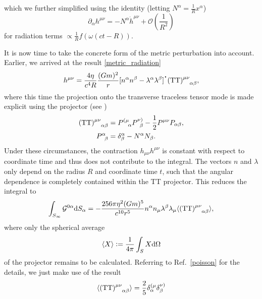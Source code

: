 which we further simplified using the identity (letting $N^\alpha = \frac{1}{R}x^\alpha$)
\begin{equation}
  \partial_\alpha h^{\mu\nu} = -N^\alpha \dot h^{\mu\nu} + \mathcal O\left(\frac{1}{R^2}\right)
\end{equation}
for radiation terms $\propto\frac{1}{R}f(\omega(ct-R))$.

It is now time to take the concrete form of the metric perturbation into account. Earlier, we arrived at the result \eqref{metric_radiation}
\begin{equation}
  h^{\mu\nu} = \frac{4\eta}{c^4 R}\frac{(Gm)^2}{r}\lbrack n^\alpha n^\beta-\lambda^\alpha\lambda^\beta\rbrack^{\scalebox{1.5}{$\cdot$}} (\mathrm{TT})^{\mu\nu}_{\hphantom{\mu\nu}\alpha\beta},
\end{equation}
where this time the projection onto the transverse traceless tensor mode is made explicit using the projector (see \cite{poisson})
\begin{equation}
  \begin{aligned}
    (\mathrm{TT})^{\mu\nu}_{\hphantom{\mu\nu}\alpha\beta} = {} & P^{(\mu}_{\hphantom{(\mu}\alpha} P^{\nu)}_{\hphantom{\nu}\beta} - \frac{1}{2} P^{\mu\nu} P_{\alpha\beta}, \\
    P^{\alpha}_{\hphantom{\alpha}\beta} = {} & \delta^\alpha_\beta - N^\alpha N_\beta.
  \end{aligned}
\end{equation}
Under these circumstances, the contraction $h_{\mu\nu} h^{\mu\nu}$ is constant with respect to coordinate time and thus does not contribute to the integral. The vectors $n$ and $\lambda$ only depend on the radius $R$ and coordinate time $t$, such that the angular dependence is completely contained within the TT projector. This reduces the integral to
\begin{equation}
  \int_{S_\infty}\mathcal G^{0\alpha}\mathrm dS_\alpha = -\frac{256\pi\eta^2(Gm)^5}{c^{10}r^5} n^\alpha n_\mu \lambda^\beta \lambda_\mu \langle(\mathrm{TT})^{\mu\nu}_{\hphantom{\mu\nu}\alpha\beta}\rangle,
\end{equation}
where only the spherical average
\begin{equation}
  \langle X\rangle \vcentcolon= \frac{1}{4\pi}\int_S X \mathrm d\Omega
\end{equation}
of the projector remains to be calculated. Referring to Ref.~\ref{poisson} for the details, we just make use of the result
\begin{equation}
  \langle(\mathrm{TT})^{\mu\nu}_{\hphantom{\mu\nu}\alpha\beta}\rangle = \frac{2}{5} \delta^{(\mu}_\alpha\delta^{\nu)}_\beta
\end{equation}

